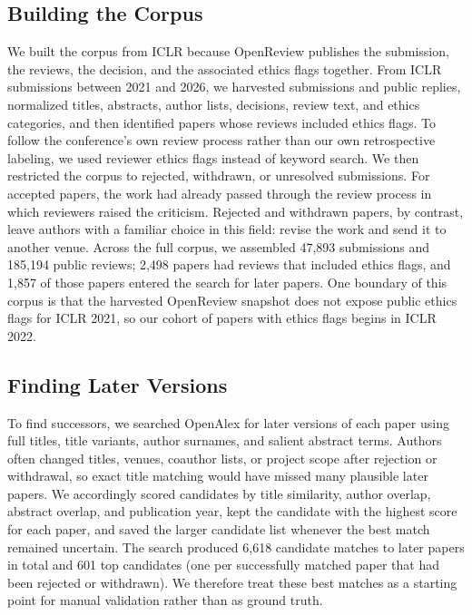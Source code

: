 \documentclass[sigconf,nonacm]{acmart} %
\begin{document}
\subsection{Building the Corpus}

We built the corpus from ICLR because OpenReview publishes the submission, the reviews, the decision, and the associated ethics flags together. From ICLR submissions between 2021 and 2026, we harvested submissions and public replies, normalized titles, abstracts, author lists, decisions, review text, and ethics categories, and then identified papers whose reviews included ethics flags. To follow the conference's own review process rather than our own retrospective labeling, we used reviewer ethics flags instead of keyword search. We then restricted the corpus to rejected, withdrawn, or unresolved submissions. For accepted papers, the work had already passed through the review process in which reviewers raised the criticism. Rejected and withdrawn papers, by contrast, leave authors with a familiar choice in this field: revise the work and send it to another venue. Across the full corpus, we assembled 47,893 submissions and 185,194 public reviews; 2,498 papers had reviews that included ethics flags, and 1,857 of those papers entered the search for later papers. One boundary of this corpus is that the harvested OpenReview snapshot does not expose public ethics flags for ICLR 2021, so our cohort of papers with ethics flags begins in ICLR 2022.

\subsection{Finding Later Versions}

To find successors, we searched OpenAlex for later versions of each paper using full titles, title variants, author surnames, and salient abstract terms. Authors often changed titles, venues, coauthor lists, or project scope after rejection or withdrawal, so exact title matching would have missed many plausible later papers. We accordingly scored candidates by title similarity, author overlap, abstract overlap, and publication year, kept the candidate with the highest score for each paper, and saved the larger candidate list whenever the best match remained uncertain. The search produced 6,618 candidate matches to later papers in total and 601 top candidates (one per successfully matched paper that had been rejected or withdrawn). We therefore treat these best matches as a starting point for manual validation rather than as ground truth.
\end{document}
